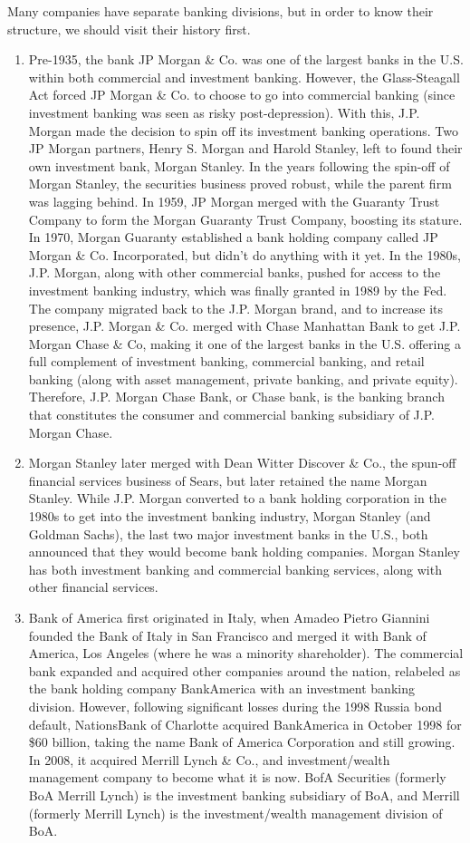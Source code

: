 \documentclass{article}
\begin{document}
  Many companies have separate banking divisions, but in order to know their structure, we should visit their history first. 
  \begin{enumerate}
    \item Pre-1935, the bank JP Morgan \& Co. was one of the largest banks in the U.S. within both commercial and investment banking. However, the Glass-Steagall Act forced JP Morgan \& Co. to choose to go into commercial banking (since investment banking was seen as risky post-depression). With this, J.P. Morgan made the decision to spin off its investment banking operations. Two JP Morgan partners, Henry S. Morgan and Harold Stanley, left to found their own investment bank, Morgan Stanley. In the years following the spin-off of Morgan Stanley, the securities business proved robust, while the parent firm was lagging behind. In 1959, JP Morgan merged with the Guaranty Trust Company to form the Morgan Guaranty Trust Company, boosting its stature. In 1970, Morgan Guaranty established a bank holding company called JP Morgan \& Co. Incorporated, but didn't do anything with it yet. In the 1980s, J.P. Morgan, along with other commercial banks, pushed for access to the investment banking industry, which was finally granted in 1989 by the Fed. The company migrated back to the J.P. Morgan brand, and to increase its presence, J.P. Morgan \& Co. merged with Chase Manhattan Bank to get J.P. Morgan Chase \& Co, making it one of the largest banks in the U.S. offering a full complement of investment banking, commercial banking, and retail banking (along with asset management, private banking, and private equity). Therefore, J.P. Morgan Chase Bank, or Chase bank, is the banking branch that constitutes the consumer and commercial banking subsidiary of J.P. Morgan Chase. 
    \item Morgan Stanley later merged with Dean Witter Discover \& Co., the spun-off financial services business of Sears, but later retained the name Morgan Stanley. While J.P. Morgan converted to a bank holding corporation in the 1980s to get into the investment banking industry, Morgan Stanley (and Goldman Sachs), the last two major investment banks in the U.S., both announced that they would become bank holding companies. Morgan Stanley has both investment banking and commercial banking services, along with other financial services. 
    \item Bank of America first originated in Italy, when Amadeo Pietro Giannini founded the Bank of Italy in San Francisco and merged it with Bank of America, Los Angeles (where he was a minority shareholder). The commercial bank expanded and acquired other companies around the nation, relabeled as the bank holding company BankAmerica with an investment banking division. However, following significant losses during the 1998 Russia bond default, NationsBank of Charlotte acquired BankAmerica in October 1998 for \$60 billion, taking the name Bank of America Corporation and still growing. In 2008, it acquired Merrill Lynch \& Co., and investment/wealth management company to become what it is now. BofA Securities (formerly BoA Merrill Lynch) is the investment banking subsidiary of BoA, and Merrill (formerly Merrill Lynch) is the investment/wealth management division of BoA. 

\end{enumerate}
\end{document}
